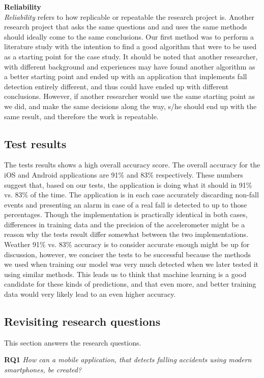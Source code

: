 \documentclass[12pt, a4paper, onecolumn]{article}
\newcommand{\parag}[1]{
	\textbf{#1} \hspace{0pt} \\
}
\begin{document}
	\parag{Reliability}
	\textit{Reliability} refers to how replicable or repeatable the research project is. Another research project that asks the same questions and and uses the same methods should ideally come to the same conclusions. Our first method was to perform a literature study with the intention to find a good algorithm that were to be used as a starting point for the case study. It should be noted that another researcher, with different background and experiences may have found another algorithm as a better starting point and ended up with an application that implements fall detection entirely different, and thus could have ended up with different conclusions. However, if another researcher would use the same starting point as we did, and make the same decisions along the way, s/he should end up with the same result, and therefore the work is repeatable.
	
	\subsection{Test results}
	The tests results shows a high overall accuracy score. The overall accuracy for the iOS and Android applications are 91\% and 83\% respectively. These numbers suggest that, based on our tests, the application is doing what it should in 91\% vs. 83\% of the time. The application is in each case accurately discarding non-fall events and presenting an alarm in case of a real fall is detected to up to those percentages.  Though the implementation is practically identical in both cases, differences in training data and the precision of the accelerometer might be a reason why the tests result differ somewhat between the two implementations. Weather 91\% vs. 83\% accuracy is to consider accurate enough might be up for discussion, however, we conciser the tests to be successful because the methods we used when training our model was very much detected when we later tested it using similar methods. This leads us to think that machine learning is a good candidate for these kinds of predictions, and that even more, and better training data would very likely lead to an even higher accuracy. 
	
	
	\subsection{Revisiting research questions}
	
	This section answers the research questions.
	
	\textbf{RQ1} \textit{How can a mobile application, that detects falling accidents using modern smartphones, be created?}
	
\end{document}
